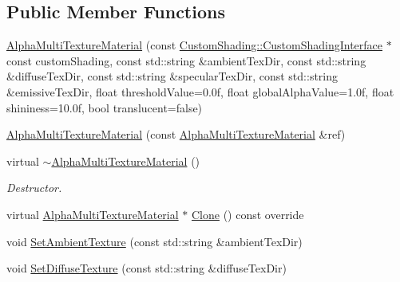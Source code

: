 \subsection*{Public Member Functions}
\begin{DoxyCompactItemize}
\item 
\mbox{\hyperlink{class_geometry_engine_1_1_geometry_material_1_1_alpha_multi_texture_material_a42d6e7532d3f628a7cb73dead01161b5}{Alpha\+Multi\+Texture\+Material}} (const \mbox{\hyperlink{class_geometry_engine_1_1_custom_shading_1_1_custom_shading_interface}{Custom\+Shading\+::\+Custom\+Shading\+Interface}} $\ast$const custom\+Shading, const std\+::string \&ambient\+Tex\+Dir, const std\+::string \&diffuse\+Tex\+Dir, const std\+::string \&specular\+Tex\+Dir, const std\+::string \&emissive\+Tex\+Dir, float threshold\+Value=0.\+0f, float global\+Alpha\+Value=1.\+0f, float shininess=10.\+0f, bool translucent=false)
\item 
\mbox{\hyperlink{class_geometry_engine_1_1_geometry_material_1_1_alpha_multi_texture_material_a1da236db5dcd0965111e3330fc276668}{Alpha\+Multi\+Texture\+Material}} (const \mbox{\hyperlink{class_geometry_engine_1_1_geometry_material_1_1_alpha_multi_texture_material}{Alpha\+Multi\+Texture\+Material}} \&ref)
\item 
\mbox{\label{class_geometry_engine_1_1_geometry_material_1_1_alpha_multi_texture_material_a8a01c763c71d82a427ef87cdb7a535b6}} 
virtual \mbox{\hyperlink{class_geometry_engine_1_1_geometry_material_1_1_alpha_multi_texture_material_a8a01c763c71d82a427ef87cdb7a535b6}{$\sim$\+Alpha\+Multi\+Texture\+Material}} ()
\begin{DoxyCompactList}\small\item\em Destructor. \end{DoxyCompactList}\item 
virtual \mbox{\hyperlink{class_geometry_engine_1_1_geometry_material_1_1_alpha_multi_texture_material}{Alpha\+Multi\+Texture\+Material}} $\ast$ \mbox{\hyperlink{class_geometry_engine_1_1_geometry_material_1_1_alpha_multi_texture_material_af31339a285fdf6180fe933f9c2f9ba16}{Clone}} () const override
\item 
void \mbox{\hyperlink{class_geometry_engine_1_1_geometry_material_1_1_alpha_multi_texture_material_afe947753d61d3d698d2b2f0dc755a63c}{Set\+Ambient\+Texture}} (const std\+::string \&ambient\+Tex\+Dir)
\item 
void \mbox{\hyperlink{class_geometry_engine_1_1_geometry_material_1_1_alpha_multi_texture_material_a33aeca61962b7b025658f66412e84e29}{Set\+Diffuse\+Texture}} (const std\+::string \&diffuse\+Tex\+Dir)

\end{DoxyCompactItemize}
